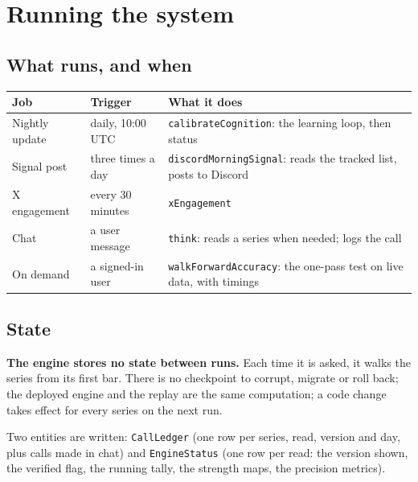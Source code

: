 \documentclass[10.5pt]{article}
\begin{document}
\section{Running the system}
\subsection*{What runs, and when}
\begin{center}\small\begin{tabular}{@{}p{3.3cm}p{4.2cm}p{7.3cm}@{}}\toprule
Job & Trigger & What it does\\\midrule
Nightly update & daily, 10:00 UTC & \texttt{calibrateCognition}: the learning loop, then status\\
Signal post & three times a day & \texttt{discordMorningSignal}: reads the tracked list, posts to Discord\\
X engagement & every 30 minutes & \texttt{xEngagement}\\
Chat & a user message & \texttt{think}: reads a series when needed; logs the call\\
On demand & a signed-in user & \texttt{walkForwardAccuracy}: the one-pass test on live data, with timings\\\bottomrule\end{tabular}\end{center}
\subsection*{State}
\textbf{The engine stores no state between runs.} Each time it is asked, it walks the series from its first bar. There is no checkpoint to corrupt, migrate or roll back; the deployed engine and the replay are the same computation; a code change takes effect for every series on the next run.

Two entities are written: \texttt{CallLedger} (one row per series, read, version and day, plus calls made in chat) and \texttt{EngineStatus} (one row per read: the version shown, the verified flag, the running tally, the strength maps, the precision metrics).
\end{document}
